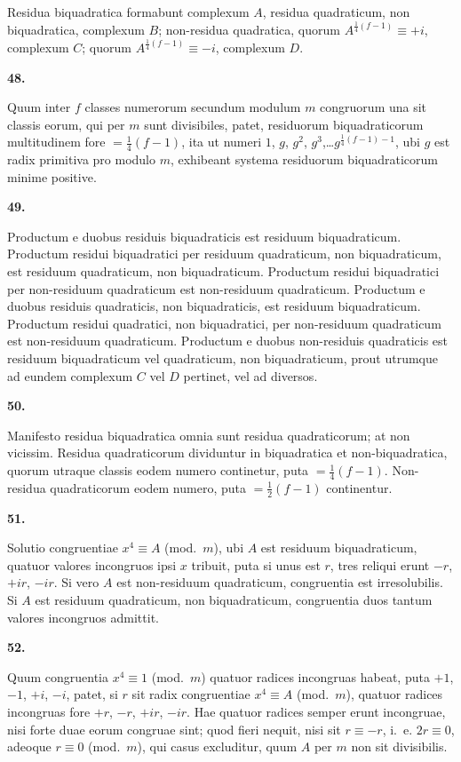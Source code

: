 \documentclass[12pt,a4paper]{article}
\newcommand{\art}[1]{\begin{center}\textbf{#1.}\end{center}}
\begin{document}
Residua biquadratica formabunt complexum $A$, residua quadraticum, non biquadratica, complexum $B$; non-residua quadratica, quorum $A^{\frac{1}{4}(f-1)}\equiv +i$, complexum $C$; quorum $A^{\frac{1}{4}(f-1)}\equiv -i$, complexum $D$.

\art{48}

Quum inter $f$ classes numerorum secundum modulum $m$ congruorum una sit classis eorum, qui per $m$ sunt divisibiles, patet, residuorum biquadraticorum multitudinem fore $=\frac{1}{4}(f-1)$, ita ut numeri $1$, $g$, $g^2$, $g^3$,\ldots$g^{\frac{1}{4}(f-1)-1}$, ubi $g$ est radix primitiva pro modulo $m$, exhibeant systema residuorum biquadraticorum minime positive.

\art{49}

Productum e duobus residuis biquadraticis est residuum biquadraticum. Productum residui biquadratici per residuum quadraticum, non biquadraticum, est residuum quadraticum, non biquadraticum. Productum residui biquadratici per non-residuum quadraticum est non-residuum quadraticum. Productum e duobus residuis quadraticis, non biquadraticis, est residuum biquadraticum. Productum residui quadratici, non biquadratici, per non-residuum quadraticum est non-residuum quadraticum. Productum e duobus non-residuis quadraticis est residuum biquadraticum vel quadraticum, non biquadraticum, prout utrumque ad eundem complexum $C$ vel $D$ pertinet, vel ad diversos.

\art{50}

Manifesto residua biquadratica omnia sunt residua quadraticorum; at non vicissim. Residua quadraticorum dividuntur in biquadratica et non-biquadratica, quorum utraque classis eodem numero continetur, puta $=\frac{1}{4}(f-1)$. Non-residua quadraticorum eodem numero, puta $=\frac{1}{2}(f-1)$ continentur.

\art{51}

Solutio congruentiae $x^4\equiv A$ (mod.~$m$), ubi $A$ est residuum biquadraticum, quatuor valores incongruos ipsi $x$ tribuit, puta si unus est $r$, tres reliqui erunt $-r$, $+ir$, $-ir$. Si vero $A$ est non-residuum quadraticum, congruentia est irresolubilis. Si $A$ est residuum quadraticum, non biquadraticum, congruentia duos tantum valores incongruos admittit.

\art{52}

Quum congruentia $x^4\equiv 1$ (mod.~$m$) quatuor radices incongruas habeat, puta $+1$, $-1$, $+i$, $-i$, patet, si $r$ sit radix congruentiae $x^4\equiv A$ (mod.~$m$), quatuor radices incongruas fore $+r$, $-r$, $+ir$, $-ir$. Hae quatuor radices semper erunt incongruae, nisi forte duae eorum congruae sint; quod fieri nequit, nisi sit $r\equiv -r$, i.~e. $2r\equiv 0$, adeoque $r\equiv 0$ (mod.~$m$), qui casus excluditur, quum $A$ per $m$ non sit divisibilis.
\end{document}
